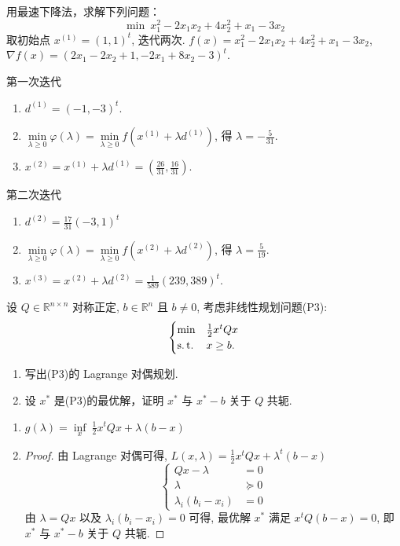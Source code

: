 \begin{Problem}
    用最速下降法，求解下列问题：
    \[\min \ x_1^2 - 2x_1x_2 + 4x_2^2 + x_1 - 3x_2\]
    取初始点 $x^{(1)} = (1, 1)^t$, 迭代两次.
    \Answer $f(x) = x_1^2 - 2x_1x_2 + 4x_2^2 + x_1 - 3x_2$, $\nabla f(x) = (2x_1 - 2x_2 + 1, -2x_1 + 8x_2 - 3)^t$. 
    
    第一次迭代 
    \begin{enumerate}
        \item $d^{(1)} = (-1, -3)^t$.
        \item $\underset{\lambda \ge 0}{\min} \varphi(\lambda) = \underset{\lambda \ge 0}{\min}f(x^{(1)} + \lambda d^{(1)})$, 得 $\lambda = -\frac{5}{31}$.
        \item $x^{(2)} = x^{(1)} + \lambda d^{(1)} = (\frac{26}{31}, \frac{16}{31})$.
    \end{enumerate}

    第二次迭代
    \begin{enumerate}
        \item $d^{(2)} = \frac{17}{31}(-3, 1)^t$
        \item $\underset{\lambda \ge 0}{\min} \varphi(\lambda) = \underset{\lambda \ge 0}{\min}f(x^{(2)} + \lambda d^{(2)})$, 得 $\lambda = \frac{5}{19}$.
        \item $x^{(3)} = x^{(2)} + \lambda d^{(2)} = \frac{1}{589}(239, 389)^t$. 
    \end{enumerate}
\end{Problem}

\begin{Problem}
    设 $Q \in \mathbb{R}^{n \times n}$ 对称正定, $b \in \mathbb{R}^n$ 且 $b\neq 0$, 考虑非线性规划问题(P3):
    \[\begin{cases}
        \min &\frac{1}{2}x^tQx\\
        \operatorname{s.t.} &x \ge b.
    \end{cases}\]
    \begin{enumerate}
        \item 写出(P3)的 Lagrange 对偶规划.
        \item 设 $x^*$ 是(P3)的最优解，证明 $x^*$ 与 $x^* - b$ 关于 $Q$ 共轭.
    \end{enumerate}

    \Answer \text{} \begin{enumerate}
        \item $g(\lambda) = \underset{x}{\inf}\ \frac{1}{2}x^tQx + \lambda(b - x)$
        \item \begin{proof}
            由 Lagrange 对偶可得, $L(x, \lambda) = \frac{1}{2}x^tQx + \lambda^t(b - x)$
            \[\begin{cases}
                Qx - \lambda &= 0\\
                \lambda &\succeq 0\\
                \lambda_i(b_i - x_i) &= 0
            \end{cases}\]
            由 $\lambda = Qx$ 以及 $\lambda_i(b_i - x_i) = 0$ 可得, 最优解 $x^*$ 满足 $x^tQ(b - x) = 0$, 即 $x^*$ 与 $x^* - b$ 关于 $Q$ 共轭. 
        \end{proof}
    \end{enumerate}
\end{Problem}

